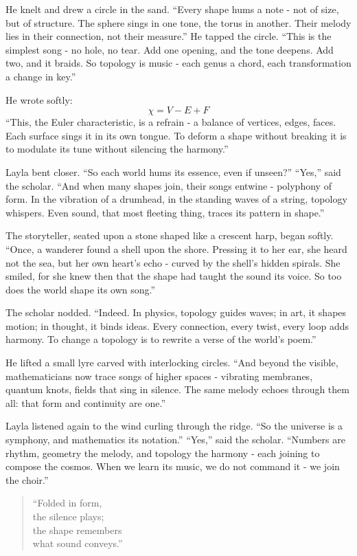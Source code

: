 \documentclass[
  letterpaper,
  DIV=11,
  numbers=noendperiod]{scrreprt}
\begin{document}
He knelt and drew a circle in the sand. ``Every shape hums a note - not
of size, but of structure. The sphere sings in one tone, the torus in
another. Their melody lies in their connection, not their measure.'' He
tapped the circle. ``This is the simplest song - no hole, no tear. Add
one opening, and the tone deepens. Add two, and it braids. So topology
is music - each genus a chord, each transformation a change in key.''

He wrote softly: \[
\chi = V - E + F
\] ``This, the Euler characteristic, is a refrain - a balance of
vertices, edges, faces. Each surface sings it in its own tongue. To
deform a shape without breaking it is to modulate its tune without
silencing the harmony.''

Layla bent closer. ``So each world hums its essence, even if unseen?''
``Yes,'' said the scholar. ``And when many shapes join, their songs
entwine - polyphony of form. In the vibration of a drumhead, in the
standing waves of a string, topology whispers. Even sound, that most
fleeting thing, traces its pattern in shape.''

The storyteller, seated upon a stone shaped like a crescent harp, began
softly. ``Once, a wanderer found a shell upon the shore. Pressing it to
her ear, she heard not the sea, but her own heart's echo - curved by the
shell's hidden spirals. She smiled, for she knew then that the shape had
taught the sound its voice. So too does the world shape its own song.''

The scholar nodded. ``Indeed. In physics, topology guides waves; in art,
it shapes motion; in thought, it binds ideas. Every connection, every
twist, every loop adds harmony. To change a topology is to rewrite a
verse of the world's poem.''

He lifted a small lyre carved with interlocking circles. ``And beyond
the visible, mathematicians now trace songs of higher spaces - vibrating
membranes, quantum knots, fields that sing in silence. The same melody
echoes through them all: that form and continuity are one.''

Layla listened again to the wind curling through the ridge. ``So the
universe is a symphony, and mathematics its notation.'' ``Yes,'' said
the scholar. ``Numbers are rhythm, geometry the melody, and topology the
harmony - each joining to compose the cosmos. When we learn its music,
we do not command it - we join the choir.''

\begin{quote}
``Folded in form,\\
the silence plays;\\
the shape remembers\\
what sound conveys.''
\end{quote}
\end{document}
